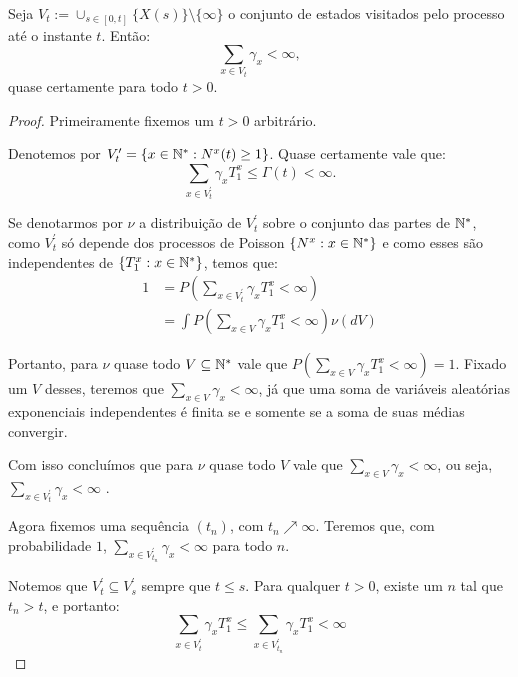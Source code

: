 \begin{proposicao}
  \label{prop:gamma-somavel}
  Seja $V_t := \cup_{s \in [0, t]} \{ X(s) \} \setminus \{\infty\}$ o
  conjunto de estados visitados pelo processo até o instante
  $t$. Então:
  \begin{displaymath}
    \sum_{x \in V_t} \gamma_x < \infty,
  \end{displaymath}
  quase certamente para todo $t > 0$.
\end{proposicao}
\begin{proof}

  Primeiramente fixemos um $t > 0$ arbitrário.

  Denotemos por $V^\prime_t = \{ x \in {\mathbb{N^*}}: N^x(t) \geq 1 \}$. Quase
  certamente vale que:
  \begin{displaymath}
    \sum_{x \in V^\prime_t} \gamma_x T^x_1 \leq \Gamma(t) < \infty.
  \end{displaymath}

  Se denotarmos por $\nu$ a distribuição de $V^\prime_t$ sobre o
  conjunto das partes de ${\mathbb{N^*}}$, como $V^\prime_t$ só depende dos
  processos de Poisson $\{N^x: x \in {\mathbb{N^*}}\}$ e como esses são
  independentes de $\{ T^x_1: x \in {\mathbb{N^*}} \}$, temos que:
  \begin{align*}
    1 &= P\left(\sum_{x \in V^\prime_t} \gamma_x T^x_1 < \infty
    \right)\\
    &=\int P\left(\sum_{x \in V} \gamma_x T^x_1 < \infty
    \right) \nu(dV)
  \end{align*}

  Portanto, para $\nu$ quase todo $V \subseteq {\mathbb{N^*}}$ vale que
  $P(\sum_{x \in V} \gamma_x T^x_1 < \infty) = 1$. Fixado um
  $V$ desses, teremos que $\sum_{x \in V}\gamma_x < \infty$, já que
  uma soma de variáveis aleatórias exponenciais independentes é finita
  \qc se e somente se a soma de suas médias convergir.

  Com isso concluímos que para $\nu$ quase todo $V$ vale que $\sum_{x
    \in V}\gamma_x < \infty$, ou seja, $\sum_{x \in
    V^\prime_t}\gamma_x < \infty$ \qc.

  Agora fixemos uma sequência $(t_n)$, com $t_n\nearrow
  \infty$. Teremos que, com probabilidade $1$, $\sum_{x \in
    V^\prime_{t_n}}\gamma_x < \infty$ para todo $n$.

  Notemos que $V^\prime_t \subseteq V^\prime_s$ sempre que $t \leq
  s$. Para qualquer $t > 0$, existe um $n$ tal que $t_n > t$, e
  portanto:
  \begin{displaymath}
    \sum_{x \in V^\prime_t}\gamma_x T^x_1 \leq
    \sum_{x \in V^\prime_{t_n}}\gamma_x T^x_1 < \infty
  \end{displaymath}


\end{proof}
